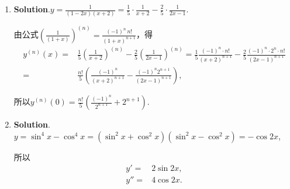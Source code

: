 \documentclass[../Main.tex]{subfiles}
\begin{document}
\begin{enumerate}
          $\mathrm{d}y=\frac{2\mathrm{e}^{y}\cos x-7}{1-2\mathrm{e}^{y}\sin x}\,\mathrm{d}
              x$，$\left.\mathrm{d}y\right|_{x=0}=\left.\frac{2\mathrm{e}^{y}\cos x-7}{1-2\mathrm{e}^{y}\sin
                  x}\right|_{x=0}\,\mathrm{d}x=-5\,\mathrm{d}x$.

    \item \textbf{Solution}.$y=\frac{1}{(1-2x)(x+2)}=\frac{1}{5}\cdot\frac{1}{x+2}
              -\frac{2}{5}\cdot\frac{1}{2x-1}$.

          由公式$\left(\frac{1}{(1+x)}\right)^{(n)}=\frac{(-1)^{n}\,n!}{(1+x)^{n+1}}$，得
          \[
              \begin{aligned}
                  y^{(n)}(x)= & \frac{1}{5}\left(\frac{1}{x+2}\right)^{(n)}-\frac{2}{5}\left(\frac{1}{2x-1}\right)^{(n)}=\frac{1}{5}\frac{(-1)^n\cdot n!}{(x+2)^{n+1}}-\frac{2}{5}\frac{(-1)^n\cdot2^n\cdot n!}{(2x-1)^{n+1}} \\
                  =           & \frac{n!}{5}\left(\frac{(-1)^n}{(x+2)^{n+1}}-\frac{(-1)^n2^{n+1}}{(2x-1)^{n+1}}\right),
              \end{aligned}
          \]

          所以$y^{(n)}(0)=\frac{n!}{5}\left(\frac{(-1)^{n}}{2^{n+1}}+2^{n+1}\right)$.

    \item \textbf{Solution}.$y=\sin^{4} x-\cos^{4} x=(\sin^{2} x+\cos^{2} x)(\sin
              ^{2} x-\cos^{2} x)=-\cos 2x$,

          所以
          \[
              \begin{aligned}
                  y'=  & 2\sin 2x, \\
                  y''= & 4\cos 2x.
              \end{aligned}
          \]
\end{enumerate}
\end{document}
